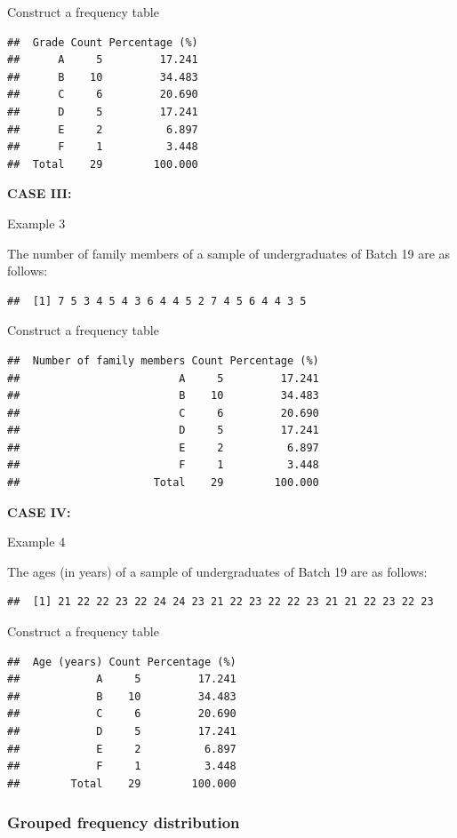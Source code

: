 \documentclass[]{book}
\begin{document}
Construct a frequency table

\begin{verbatim}
##  Grade Count Percentage (%)
##      A     5         17.241
##      B    10         34.483
##      C     6         20.690
##      D     5         17.241
##      E     2          6.897
##      F     1          3.448
##  Total    29        100.000
\end{verbatim}

\textbf{CASE III:}

Example 3

The number of family members of a sample of undergraduates of Batch 19 are as follows:

\begin{verbatim}
##  [1] 7 5 3 4 5 4 3 6 4 4 5 2 7 4 5 6 4 4 3 5
\end{verbatim}

Construct a frequency table

\begin{verbatim}
##  Number of family members Count Percentage (%)
##                         A     5         17.241
##                         B    10         34.483
##                         C     6         20.690
##                         D     5         17.241
##                         E     2          6.897
##                         F     1          3.448
##                     Total    29        100.000
\end{verbatim}

\textbf{CASE IV:}

Example 4

The ages (in years) of a sample of undergraduates of Batch 19 are as follows:

\begin{verbatim}
##  [1] 21 22 22 23 22 24 24 23 21 22 23 22 22 23 21 21 22 23 22 23
\end{verbatim}

Construct a frequency table

\begin{verbatim}
##  Age (years) Count Percentage (%)
##            A     5         17.241
##            B    10         34.483
##            C     6         20.690
##            D     5         17.241
##            E     2          6.897
##            F     1          3.448
##        Total    29        100.000
\end{verbatim}

\hypertarget{grouped-frequency-distribution}{%
\subsubsection{Grouped frequency distribution}\label{grouped-frequency-distribution}}
\end{document}
